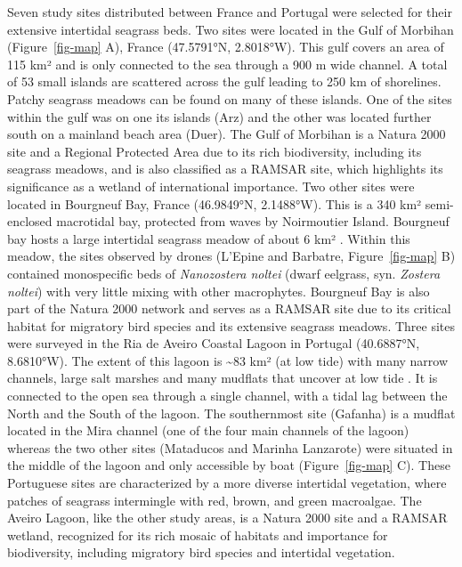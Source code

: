 \documentclass[
  number]{elsarticle}
\begin{document}
Seven study sites distributed between France and Portugal were selected
for their extensive intertidal seagrass beds. Two sites were located in
the Gulf of Morbihan (Figure~\ref{fig-map} A), France (47.5791°N,
2.8018°W). This gulf covers an area of 115 km² and is only connected to
the sea through a 900 m wide channel. A total of 53 small islands are
scattered across the gulf leading to 250 km of shorelines. Patchy
seagrass meadows can be found on many of these islands. One of the sites
within the gulf was on one its islands (Arz) and the other was located
further south on a mainland beach area (Duer). The Gulf of Morbihan is a
Natura 2000 site and a Regional Protected Area due to its rich
biodiversity, including its seagrass meadows, and is also classified as
a RAMSAR site, which highlights its significance as a wetland of
international importance. Two other sites were located in Bourgneuf Bay,
France (46.9849°N, 2.1488°W). This is a 340 km² semi-enclosed macrotidal
bay, protected from waves by Noirmoutier Island. Bourgneuf bay hosts a
large intertidal seagrass meadow of about 6 km²
\citep{ZOFFOLI2020112020}. Within this meadow, the sites observed by
drones (L'Epine and Barbatre, Figure~\ref{fig-map} B) contained
monospecific beds of \emph{Nanozostera noltei} (dwarf eelgrass, syn.
\emph{Zostera noltei}) with very little mixing with other macrophytes.
Bourgneuf Bay is also part of the Natura 2000 network and serves as a
RAMSAR site due to its critical habitat for migratory bird species and
its extensive seagrass meadows. Three sites were surveyed in the Ria de
Aveiro Coastal Lagoon in Portugal (40.6887°N, 8.6810°W). The extent of
this lagoon is \textasciitilde83 km² (at low tide) with many narrow
channels, large salt marshes and many mudflats that uncover at low tide
\citep{sousa2017blue}. It is connected to the open sea through a single
channel, with a tidal lag between the North and the South of the lagoon.
The southernmost site (Gafanha) is a mudflat located in the Mira channel
(one of the four main channels of the lagoon) whereas the two other
sites (Mataducos and Marinha Lanzarote) were situated in the middle of
the lagoon and only accessible by boat (Figure~\ref{fig-map} C). These
Portuguese sites are characterized by a more diverse intertidal
vegetation, where patches of seagrass intermingle with red, brown, and
green macroalgae. The Aveiro Lagoon, like the other study areas, is a
Natura 2000 site and a RAMSAR wetland, recognized for its rich mosaic of
habitats and importance for biodiversity, including migratory bird
species and intertidal vegetation.
\end{document}
